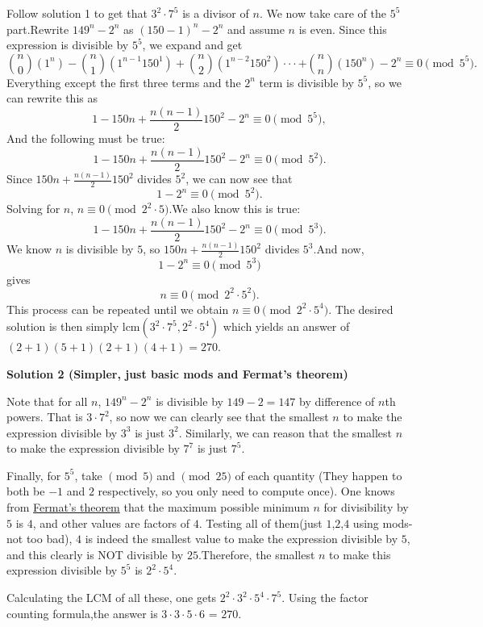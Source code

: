 \begin{enumerate}
Follow solution 1 to get that $3^2 \cdot 7^5$ is a divisor of $n$. We now take care of the $5^5$ part.Rewrite $149^n-2^n$ as $(150-1)^n-2^n$ and assume $n$ is even. Since this expression is divisible by $5^5$, we expand and get 
 \[\binom n0(1^n)-\binom n1(1^{n-1}150^1)+\binom n2(1^{n-2}150^2)\cdot\cdot\cdot+\binom nn(150^n)-2^n \equiv 0 \pmod {5^5}.\]Everything except the first three terms and the $2^n$ term is divisible by $5^5$, so we can rewrite this as
 \[1-150n+\frac{n(n-1)}{2}150^2-2^n \equiv 0 \pmod {5^5},\]And the following must be true:
 \[1-150n+\frac{n(n-1)}{2}150^2-2^n \equiv 0 \pmod {5^2}.\]Since $150n+\frac{n(n-1)}{2}150^2$ divides $5^2$, we can now see that
 \[1-2^n \equiv 0 \pmod {5^2}.\]Solving for $n$, $n \equiv 0 \pmod {2^2 \cdot 5}$.We also know this is true:
 \[1-150n+\frac{n(n-1)}{2}150^2-2^n \equiv 0 \pmod {5^3}.\]We know $n$ is divisible by $5$, so $150n+\frac{n(n-1)}{2}150^2$ divides $5^3$.And now,
 \[1-2^n \equiv 0 \pmod {5^3}\]gives 
 \[n \equiv 0 \pmod {2^2 \cdot 5^2}.\]This process can be repeated until we obtain $n \equiv 0 \pmod {2^2 \cdot 5^4}$. The desired solution is then simply $\text{lcm} (3^2 \cdot 7^5, 2^2 \cdot 5^4)$ which yields an answer of $(2+1)(5+1)(2+1)(4+1)=\boxed{270}$.

 



\textbf{Solution 2 (Simpler, just basic mods and Fermat's theorem)}

Note that for all $n$, $149^n - 2^n$ is divisible by $149-2 = 147$ by difference of $n$th powers. That is $3\cdot7^2$, so now we can clearly see that the smallest $n$ to make the expression divisible by $3^3$ is just $3^2$. Similarly, we can reason that the smallest $n$ to make the expression divisible by $7^7$ is just $7^5$. 

 Finally, for $5^5$, take $\pmod {5}$ and $\pmod {25}$ of each quantity (They happen to both be $-1$ and $2$ respectively, so you only need to compute once). One knows from \href{https://artofproblemsolving.com/wiki/index.php?title=Fermat\%27s\_theorem}{Fermat's theorem} that the maximum possible minimum $n$ for divisibility by $5$ is $4$, and other values are factors of $4$. Testing all of them(just $1$,$2$,$4$ using mods-not too bad), $4$ is indeed the smallest value to make the expression divisible by $5$, and this clearly is NOT divisible by $25$.Therefore, the smallest $n$ to make this expression divisible by $5^5$ is $2^2 \cdot 5^4$.

 Calculating the LCM of all these, one gets $2^2 \cdot 3^2 \cdot 5^4 \cdot 7^5$. Using the factor counting formula,the answer is $3\cdot3\cdot5\cdot6$ = $\boxed{270}$.


\end{enumerate}
